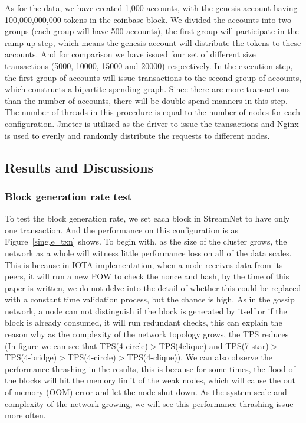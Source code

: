 As for the data, we have created 1,000 accounts, with the genesis account having 100,000,000,000 tokens in the coinbase block.
We divided the accounts into two groups (each group will have 500 accounts), the first group will participate in the ramp up step, which means the genesis account will distribute the tokens to these accounts.
And for comparison we have issued four set of different size transactions (5000, 10000, 15000 and 20000) respectively.
In the execution step, the first group of accounts will issue transactions to the second group of accounts, which constructs a bipartite spending graph. 
Since there are more transactions than the number of accounts, there will be double spend manners in this step.
The number of threads in this procedure is equal to the number of nodes for each configuration.
Jmeter is utilized as the driver to issue the transactions and Nginx is used to evenly and randomly distribute the requests to different nodes.

\subsection {Results and Discussions}

\subsubsection {Block generation rate test}
To test the block generation rate, we set each block in StreamNet to have only one transaction.
And the performance on this configuration is as Figure~\ref{single_txn} shows.
To begin with, as the size of the cluster grows, the network as a whole will witness little performance loss on all of the data scales. 
This is because in IOTA implementation, when a node receives data from its peers, it will run a new POW to check the nonce and hash, by the time of this paper is written, 
we do not delve into the detail of whether this could be replaced with a constant time validation process, but the chance is high.
As in the gossip network, a node can not distinguish if the block is generated by itself or if the block is already consumed, it will run redundant checks, this can explain
the reason why as the complexity of the network topology grows, the TPS reduces (In figure we can see that TPS(4-circle)$>$TPS(4\-clique) and TPS(7-star)$>$TPS(4-bridge)$>$TPS(4-circle)$>$TPS(4-clique)).  
We can also observe the performance thrashing in the results, 
this is because for some times, the flood of the blocks will hit the memory limit of the weak nodes, which will cause the out of memory (OOM) error and let the node shut down. 
As the system scale and complexity of the network growing, we will see this performance thrashing issue more often.

